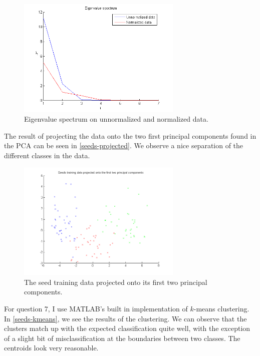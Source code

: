 \documentclass[11pt,a4paper]{article}
\begin{document}
\begin{figure}[h!]
    \centering
    \includegraphics[width=0.7\textwidth]{images/eigenvalue-spectrum}
    \caption{Eigenvalue spectrum on unnormalized and normalized data.}
    \label{eigenvalue-spectrum}
\end{figure}

The result of projecting the data onto the two first principal components
found in the PCA can be seen in \autoref{seeds-projected}. We observe a nice
separation of the different classes in the data.

\begin{figure}[h!]
    \centering
    \includegraphics[width=0.7\textwidth]{images/seeds-projected}
    \caption{The seed training data projected onto its first two principal components.}
    \label{seeds-projected}
\end{figure}

For question 7, I use MATLAB's built in implementation of $k$-means
clustering. In \autoref{seeds-kmeans}, we see the results of the clustering.
We can observe that the clusters match up with the expected classification
quite well, with the exception of a slight bit of misclassification at the
boundaries between two classes. The centroids look very reasonable.
\end{document}
